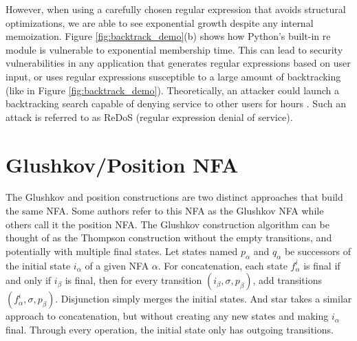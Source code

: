 However, when using a carefully chosen regular expression that avoids structural optimizations, we are able to see exponential growth despite any internal memoization. Figure \ref{fig:backtrack_demo}(b) shows how Python's built-in re module is vulnerable to exponential membership time. This can lead to security vulnerabilities in any application that generates regular expressions based on user input, or uses regular expressions susceptible to a large amount of backtracking (like in Figure \ref{fig:backtrack_demo}). Theoretically, an attacker could launch a backtracking search capable of denying service to other users for hours \cite{cata-backtrack}. Such an attack is referred to as ReDoS (regular expression denial of service).






\section{Glushkov/Position NFA}
\label{sec:Glushkov/Position NFA}
The Glushkov and position constructions are two distinct approaches that build the same NFA. Some authors refer to this NFA as the Glushkov NFA while others call it the position NFA. The Glushkov construction \cite{glushkov-yu} algorithm can be thought of as the Thompson construction without the empty transitions, and potentially with multiple final states. Let states named $p_\alpha$ and $q_\alpha$ be successors of the initial state $i_\alpha$ of a given NFA $\alpha$. For concatenation, each state $f^i_\alpha$ is final if and only if $i_\beta$ is final, then for every transition $(i_\beta, \sigma, p_\beta)$, add transitions $(f^i_\alpha, \sigma, p_\beta)$. Disjunction simply merges the initial states. And star takes a similar approach to concatenation, but without creating any new states and making $i_\alpha$ final. Through every operation, the initial state only has outgoing transitions.

